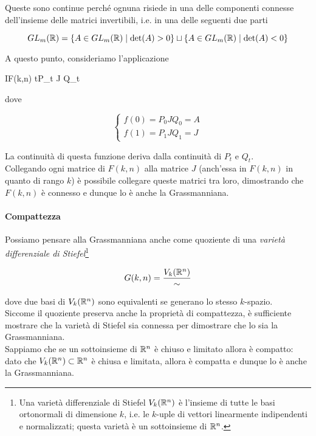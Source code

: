 Queste sono continue perché ognuna risiede in una delle componenti connesse dell'insieme delle matrici invertibili, i.e. in una delle seguenti due parti

\begin{equation}
	GL_{m}(\mathbb{R}) = \{ A \in GL_{m}(\mathbb{R}) \mid \det(A) > 0 \} \sqcup \{ A \in GL_{m}(\mathbb{R}) \mid \det(A) < 0 \}
\end{equation}

A questo punto, consideriamo l'applicazione

	{I}{F(k,n)}
	{t}{P_{t} J Q_{t}}

dove

\begin{equation}
	\begin{cases}
		f(0) = P_{0} J Q_{0} = A\\
		f(1) = P_{1} J Q_{1} = J
	\end{cases}
\end{equation}

La continuità di questa funzione deriva dalla continuità di $ P_{t} $ e $ Q_{t} $.\\
Collegando ogni matrice di $ F(k,n) $ alla matrice $ J $ (anch'essa in $ F(k,n) $ in quanto di rango $ k $) è possibile collegare queste matrici tra loro, dimostrando che $ F(k,n) $ è connesso e dunque lo è anche la Grassmanniana.

\paragraph{Compattezza}

Possiamo pensare alla Grassmanniana anche come quoziente di una \textit{varietà differenziale di Stiefel}\footnote{%
	Una varietà differenziale di Stiefel $ V_{k}(\mathbb{R}^{n}) $ è l'insieme di tutte le basi ortonormali di dimensione $ k $, i.e. le $ k $-uple di vettori linearmente indipendenti e normalizzati; questa varietà è un sottoinsieme di $ \mathbb{R}^{n} $.%
}

\begin{equation}
	G(k,n) = \dfrac{V_{k}(\mathbb{R}^{n})}{\sim}
\end{equation}

dove due basi di $ V_{k}(\mathbb{R}^{n}) $ sono equivalenti se generano lo stesso $ k $-spazio.\\
Siccome il quoziente preserva anche la proprietà di compattezza, è sufficiente mostrare che la varietà di Stiefel sia connessa per dimostrare che lo sia la Grassmanniana.\\
Sappiamo che se un sottoinsieme di $ \mathbb{R}^{n} $ è chiuso e limitato allora è compatto: dato che $ V_{k}(\mathbb{R}^{n}) \subset \mathbb{R}^{n} $ è chiusa e limitata, allora è compatta e dunque lo è anche la Grassmanniana.

